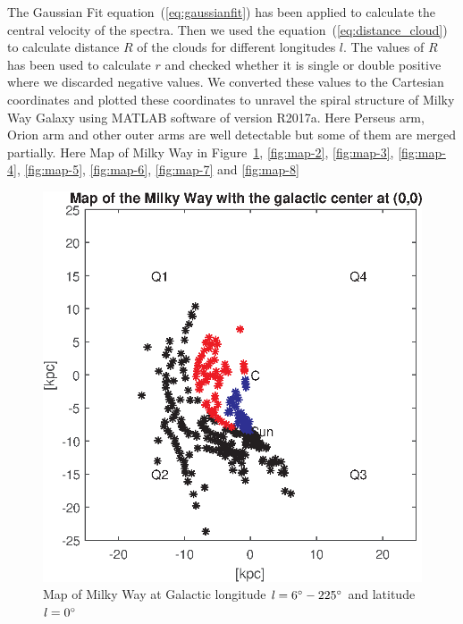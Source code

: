 \documentclass[fleqn,usenatbib]{mnras}
\begin{document}
The Gaussian Fit equation~(\ref{eq:gaussianfit}) has been applied to calculate the central velocity of the spectra. Then we used the equation~(\ref{eq:distance_cloud}) to calculate distance $\mathit{R}$ of the clouds for different longitudes $\mathit{l}$. The values of $\mathit{R}$ has been used to calculate $\mathit{r}$ and checked whether it is single or double positive where we discarded negative values. We converted these values to the Cartesian coordinates and plotted these coordinates to unravel the spiral structure of Milky Way Galaxy using MATLAB software of version R2017a. Here Perseus arm, Orion arm and other outer arms are well detectable but some of them are merged partially. Here Map of Milky Way in Figure~\ref{fig:map-1}, \ref{fig:map-2}, \ref{fig:map-3}, \ref{fig:map-4}, \ref{fig:map-5}, \ref{fig:map-6}, \ref{fig:map-7} and \ref{fig:map-8}

\begin{figure}
      \includegraphics[width=\columnwidth]{Map_1}
      \caption{Map of Milky Way at Galactic longitude $\mathit{l}=6\hbox{$^\circ$}-225\hbox{$^\circ$}$ and latitude $\mathit{l}=0\hbox{$^\circ$}$}
      \label{fig:map-1}
\end{figure}
\end{document}
